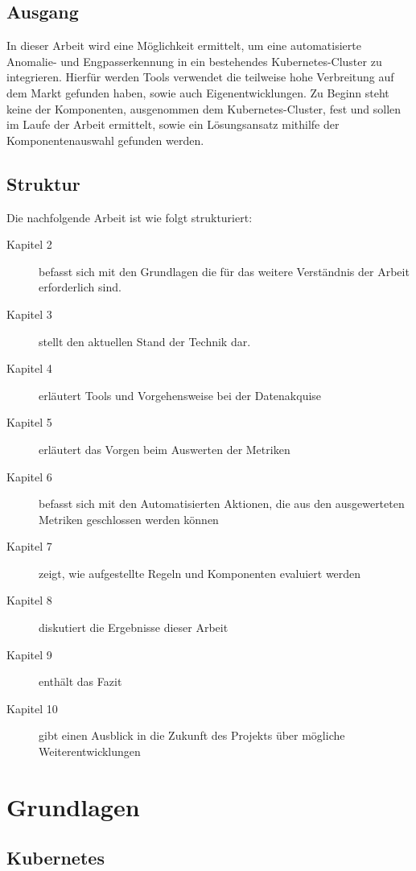 \documentclass[a4paper,12pt]{scrartcl}
\begin{document}
\subsection{Ausgang}

In dieser Arbeit wird eine Möglichkeit ermittelt, um eine automatisierte Anomalie- und Engpasserkennung in ein bestehendes Kubernetes-Cluster zu integrieren. Hierfür werden Tools verwendet die teilweise hohe Verbreitung auf dem Markt gefunden haben, sowie auch Eigenentwicklungen. Zu Beginn steht keine der Komponenten, ausgenommen dem Kubernetes-Cluster, fest und sollen im Laufe der Arbeit ermittelt, sowie ein Lösungsansatz mithilfe der Komponentenauswahl gefunden werden.

\subsection{Struktur}

Die nachfolgende Arbeit ist wie folgt strukturiert:\\

\begin{description}

\item [Kapitel 2] befasst sich mit den Grundlagen die für das weitere Verständnis der Arbeit erforderlich sind.
\item [Kapitel 3] stellt den aktuellen Stand der Technik dar.
\item [Kapitel 4] erläutert Tools und Vorgehensweise bei der Datenakquise
\item [Kapitel 5] erläutert das Vorgen beim Auswerten der Metriken
\item [Kapitel 6] befasst sich mit den Automatisierten Aktionen, die aus den ausgewerteten Metriken geschlossen werden können
\item [Kapitel 7] zeigt, wie aufgestellte Regeln und Komponenten evaluiert werden
\item [Kapitel 8] diskutiert die Ergebnisse dieser Arbeit
\item [Kapitel 9] enthält das Fazit
\item [Kapitel 10] gibt einen Ausblick in die Zukunft des Projekts über mögliche Weiterentwicklungen
\end{description}

\section{Grundlagen}
\subsection{Kubernetes}
\end{document}
